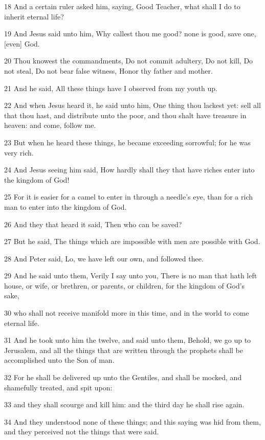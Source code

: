 \par 18 And a certain ruler asked him, saying, Good Teacher, what shall I do to inherit eternal life?
\par 19 And Jesus said unto him, Why callest thou me good? none is good, save one, [even] God.
\par 20 Thou knowest the commandments, Do not commit adultery, Do not kill, Do not steal, Do not bear false witness, Honor thy father and mother.
\par 21 And he said, All these things have I observed from my youth up.
\par 22 And when Jesus heard it, he said unto him, One thing thou lackest yet: sell all that thou hast, and distribute unto the poor, and thou shalt have treasure in heaven: and come, follow me.
\par 23 But when he heard these things, he became exceeding sorrowful; for he was very rich.
\par 24 And Jesus seeing him said, How hardly shall they that have riches enter into the kingdom of God!
\par 25 For it is easier for a camel to enter in through a needle's eye, than for a rich man to enter into the kingdom of God.
\par 26 And they that heard it said, Then who can be saved?
\par 27 But he said, The things which are impossible with men are possible with God.
\par 28 And Peter said, Lo, we have left our own, and followed thee.
\par 29 And he said unto them, Verily I say unto you, There is no man that hath left house, or wife, or brethren, or parents, or children, for the kingdom of God's sake,
\par 30 who shall not receive manifold more in this time, and in the world to come eternal life.
\par 31 And he took unto him the twelve, and said unto them, Behold, we go up to Jerusalem, and all the things that are written through the prophets shall be accomplished unto the Son of man.
\par 32 For he shall be delivered up unto the Gentiles, and shall be mocked, and shamefully treated, and spit upon:
\par 33 and they shall scourge and kill him: and the third day he shall rise again.
\par 34 And they understood none of these things; and this saying was hid from them, and they perceived not the things that were said.
